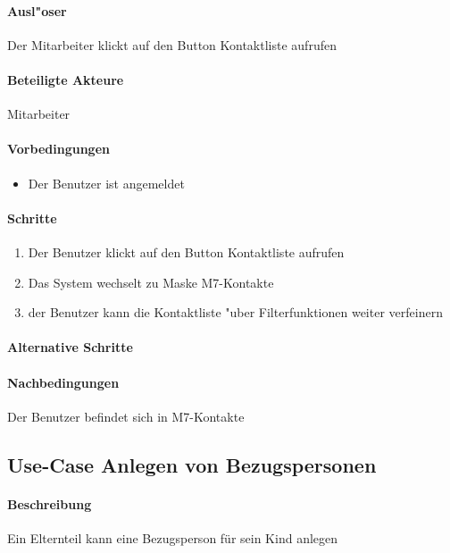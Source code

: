   \paragraph{Ausl"oser}
  Der Mitarbeiter klickt auf den Button \dq Kontaktliste aufrufen\dq
  \paragraph{Beteiligte Akteure}   \leavevmode \newline
    Mitarbeiter
  \paragraph{Vorbedingungen}
  \begin{itemize}
   \item Der Benutzer ist angemeldet
  \end{itemize}

  \paragraph{Schritte}
  \begin{enumerate}
   \item Der Benutzer klickt auf den Button \dq Kontaktliste aufrufen\dq
   \item Das System wechselt zu Maske M7-Kontakte
   \item der Benutzer kann die Kontaktliste "uber Filterfunktionen weiter verfeinern
  \end{enumerate}

  \paragraph{Alternative Schritte}
  \paragraph{Nachbedingungen}
  Der Benutzer befindet sich in M7-Kontakte
  
  
  
	
	\newpage
	\subsection{Use-Case Anlegen von Bezugspersonen}
		\paragraph{Beschreibung}
		Ein Elternteil kann eine Bezugsperson für sein Kind anlegen
